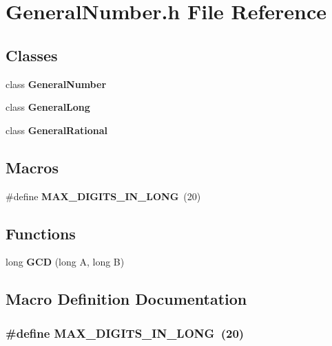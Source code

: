 \section{General\+Number.\+h File Reference}
\label{GeneralNumber_8h}
\subsection*{Classes}
\begin{DoxyCompactItemize}
\item 
class {\bf General\+Number}
\item 
class {\bf General\+Long}
\item 
class {\bf General\+Rational}
\end{DoxyCompactItemize}
\subsection*{Macros}
\begin{DoxyCompactItemize}
\item 
\#define {\bf M\+A\+X\+\_\+\+D\+I\+G\+I\+T\+S\+\_\+\+I\+N\+\_\+\+L\+O\+NG}~(20)
\end{DoxyCompactItemize}
\subsection*{Functions}
\begin{DoxyCompactItemize}
\item 
long {\bf G\+CD} (long A, long B)
\end{DoxyCompactItemize}


\subsection{Macro Definition Documentation}
\subsubsection[{M\+A\+X\+\_\+\+D\+I\+G\+I\+T\+S\+\_\+\+I\+N\+\_\+\+L\+O\+NG}]{\setlength{\rightskip}{0pt plus 5cm}\#define M\+A\+X\+\_\+\+D\+I\+G\+I\+T\+S\+\_\+\+I\+N\+\_\+\+L\+O\+NG~(20)}\label{GeneralNumber_8h_a4536bcf3e78506090145549baf064f59}


